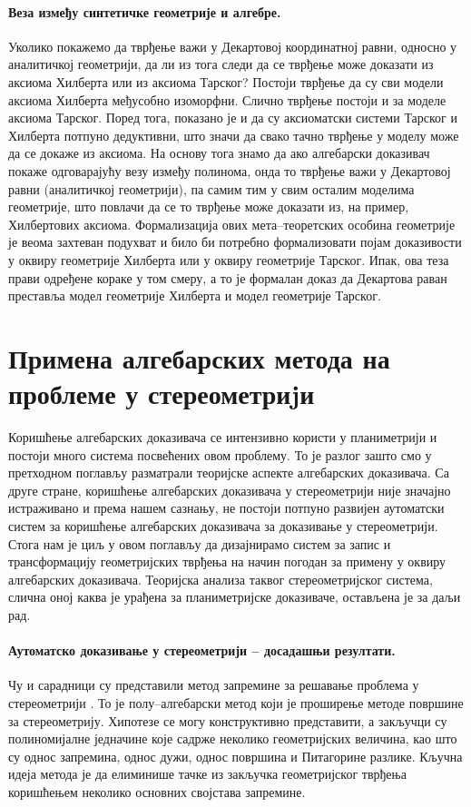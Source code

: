 \paragraph{Веза између синтетичке геометрије и алгебре.} 
Уколико покажемо да тврђење важи у Декартовој координатној равни,
односно у аналитичкој геометрији, да ли из тога следи да се тврђење
може доказати из аксиома Хилберта или из аксиома Тарског? Постоји
тврђење да су сви модели аксиома Хилберта међусобно изоморфни. Слично
тврђење постоји и за моделе аксиома Тарског. Поред тога, показано је и
да су аксиоматски системи Тарског и Хилберта потпуно дедуктивни, што
значи да свако тачно тврђење у моделу може да се докаже из аксиома. На
основу тога знамо да ако алгебарски доказивач покаже одговарајућу везу
између полинома, онда то тврђење важи у Декартовој равни (аналитичкој
геометрији), па самим тим у свим осталим моделима геометрије, што
повлачи да се то тврђење може доказати из, на пример, Хилбертових
аксиома. Формализација ових мета--теоретских особина геометрије је
веома захтеван подухват и било би потребно формализовати појам
доказивости у оквиру геометрије Хилберта или у оквиру геометрије
Тарског. Ипак, ова теза прави одређене кораке у том смеру, а то је
формалан доказ да Декартова раван преставља модел геометрије Хилберта
и модел геометрије Тарског.


\section{Примена алгебарских метода на проблеме у стереометриjи}

Коришћење алгебарских доказивача се интензивно користи у планиметрији и
постоји много система посвећених овом проблему. То је разлог зашто смо
у претходном поглављу разматрали теоријске аспекте алгебарских
доказивача. Са друге стране, коришћење алгебарских доказивача у
стереометрији није значајно истраживано и према нашем сазнању, не
постоји потпуно развијен аутоматски систем за коришћење алгебарских
доказивача за доказивање у стереометрији. Стога нам је циљ у овом
поглављу да дизајнирамо систем за запис и трансформацију геометријских
тврђења на начин погодан за примену у оквиру алгебарских
доказивача. Теоријска анализа таквог стереометријског система, слична
оној каква је урађена за планиметријске доказиваче, остављена је за
даљи рад.

\paragraph{Аутоматско доказивање у стереометрији -- досадашњи резултати.}
Чу и сарадници су представили метод запремине за решавање проблема у
стереометрији \cite{volumemethod}.  То је полу--алгебарски метод који
је проширење методе површине за стереометрију. Хипотезе се могу
конструктивно представити, а закључци су полиномијалне једначине које
садрже неколико геометријских величина, као што су однос запремина,
однос дужи, однос површина и Питагорине разлике. Кључна идеја метода
је да елиминише тачке из закључка геометријског тврђења коришћењем
неколико основних својстава запремине.


